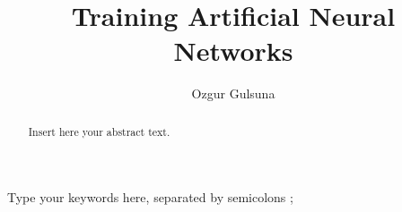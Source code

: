 \documentclass[3p,times,procedia]{elsarticle}
\begin{document}
\begin{frontmatter}





\title{\textbf{Training Artificial Neural Networks}}




\author[]{Ozgur Gulsuna} 

\address[]{Middle East Technical University, Electrical and Electronics Engineering, Ankara, Turkey}

\begin{abstract}
Insert here your abstract text.
\end{abstract}

\begin{keyword}
Type your keywords here, separated by semicolons ; 



\end{keyword}
\end{frontmatter}
\end{document}
